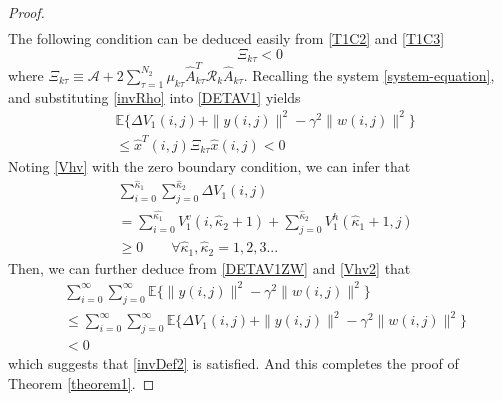 \documentclass[journal,final,twocolumn]{IEEEtran}
\newtheorem{remark}{Remark}
\begin{document}
\begin{proof}
\begin{equation}
\begin{split}
		\end{split}
	\end{equation} 
	The following condition can be deduced easily from \eqref{T1C2} and \eqref{T1C3}
	\begin{equation}\label{T1P4}
	\mathcal{\varXi}_{k\tau }<0
	\end{equation}	
	where $\mathcal{\varXi}_{k\tau } \equiv \mathcal{A} +2\sum_{\tau =1}^{N_{2}}\mu_{k\tau }\hat{A}^{T}_{k\tau }\mathcal{R}_{k}\hat{A}_{k\tau }$. 
	Recalling the system \eqref{system-equation}, and substituting \eqref{invRho} into \eqref{DETAV1} yields
	\begin{equation}\label{DETAV1ZW}
		\begin{split}
			&\mathbb{E}\{\varDelta V_{1}(i,j)+\|y(i,j)\|^{2}-\gamma^{2}\|w(i,j)\|^{2}  \}\\
			&\leq \hat{x}^{T}(i,j)\mathcal{\varXi}_{k\tau } \hat{x}(i,j)<0
		\end{split}
	\end{equation}
	Noting \eqref{Vhv} with the zero boundary condition, we can infer that
	\begin{equation} \label{Vhv2}
	\begin{split}
	&\sum_{i=0}^{\hat{\kappa}_{1}}\sum_{j=0}^{\hat{\kappa}_{2}}  \varDelta V_{1}(i,j)\\
	&=\sum_{i=0}^{\hat{\kappa_{1}}}V^{v}_{1}(i,\hat{\kappa}_{2}+1) + \sum_{j=0}^{\hat{\kappa}_{2}}V^{h}_{1}(\hat{\kappa}_{1}+1,j) \\
	&\geq 0 \qquad \forall \hat{\kappa}_{1},\hat{\kappa}_{2} = 1,2,3...
	\end{split}
	\end{equation}
	Then, we can further deduce from \eqref{DETAV1ZW} and \eqref{Vhv2} that 
	\begin{equation}\label{DETAV1ZW2}
	\begin{split}
	&\sum_{i=0}^{\infty}\sum_{j=0}^{\infty}  \mathbb{E}\{\|y(i,j)\|^{2}-\gamma^{2}\|w(i,j)\|^{2}  \}\\
	&\leq \sum_{i=0}^{\infty}\sum_{j=0}^{\infty}  \mathbb{E}\{\varDelta V_{1}(i,j)+\|y(i,j)\|^{2}-\gamma^{2}\|w(i,j)\|^{2}  \}  \\
	&< 0
	\end{split}
	\end{equation}
	which suggests that \eqref{invDef2} is satisfied. And this completes the proof of Theorem \ref{theorem1}.
	
	
\end{proof}
\end{document}
